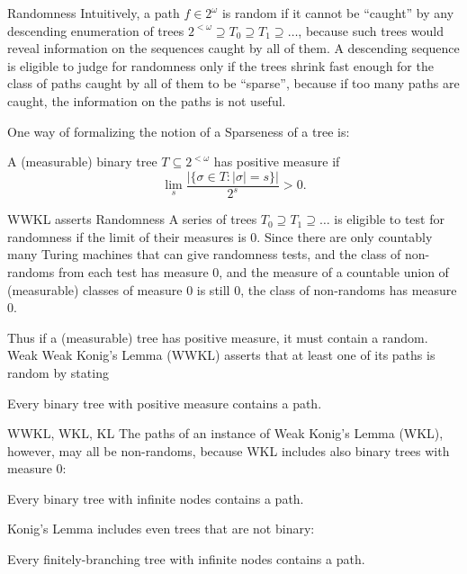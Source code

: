 \begin{frame}{Randomness}
  Intuitively, a path $f\in2^\omega$ is random if it cannot be ``caught''
  by any descending enumeration of trees $2^{<\omega}\supseteq T_0\supseteq
  T_1\supseteq \ldots$, because such trees would reveal information on the
  sequences caught by all of them. A descending sequence is eligible to judge
  for randomness only if the trees shrink fast enough for the class of paths
  caught by all of them to be ``sparse'', because if too many paths are
  caught, the information on the paths is not useful.

  \vspace{1em}
  One way of formalizing the notion of a Sparseness of a tree is:
  \begin{define*}
    A (measurable) binary tree $T\subseteq2^{<\omega}$ has positive measure
    if
    \[\lim_s \frac{|\{\sigma\in T: |\sigma|=s\}|}{2^s} >0.\]
  \end{define*}
\end{frame}

\begin{frame}{WWKL asserts Randomness}
  A series of trees $T_0\supseteq T_1\supseteq\ldots$ is eligible to
  test for randomness if the limit of their measures is 0. Since there are
  only countably many Turing machines that can give randomness tests,
  and the class of non-randoms from each test has measure 0, and the
  measure of a countable union of (measurable) classes of measure 0 is
  still 0, the class of non-randoms has measure 0.

  \vspace{2em}
  Thus if a (measurable) tree has positive measure, it must contain a
  random. Weak Weak Konig's Lemma (WWKL) asserts that at least one of its
  paths is random by stating
  \begin{thm*}
    Every binary tree with positive measure contains a path.
  \end{thm*}
\end{frame}

\begin{frame}{WWKL, WKL, KL}
  The paths of an instance of Weak Konig's Lemma (WKL), however, may
  all be non-randoms, because WKL includes also binary trees with measure
  0:
  \begin{thm*}
    Every binary tree with infinite nodes contains a path.
  \end{thm*}

  \vspace{2em}
  Konig's Lemma includes even trees that are not binary:
  \begin{thm*}
    Every finitely-branching tree with infinite nodes contains a path.
  \end{thm*}
\end{frame}

